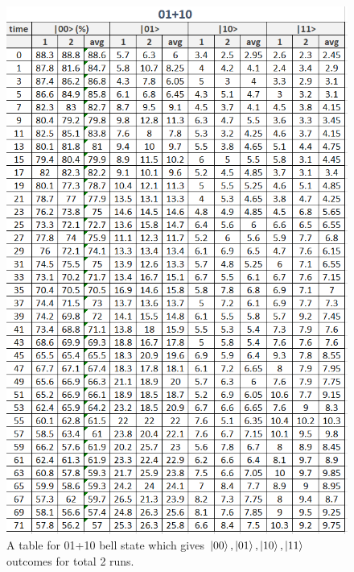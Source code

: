 \documentclass[letterpaper]{article}
\numberwithin{equation}{section} %
\numberwithin{figure}{section} %
\numberwithin{table}{section} %
\begin{document}
\begin{figure}[h]
	\includegraphics[width=120mm,scale=1.0]{t01n10}
	\caption{A table for 01+10 bell state which gives $\ket{00}, \ket{01}, \ket{10}, \ket{11}$ outcomes for total 2 runs.}
	\label{t01n10}
\end{figure}
\end{document}
